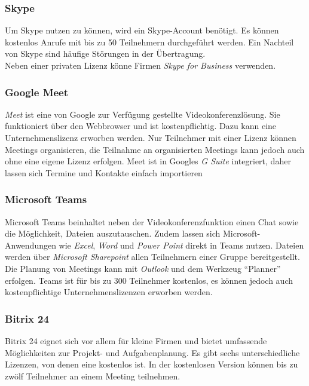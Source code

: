 \subsubsection{Skype}
Um Skype nutzen zu können, wird ein Skype-Account benötigt.
Es können kostenlos Anrufe mit bis zu 50 Teilnehmern durchgeführt werden.
Ein Nachteil von Skype sind häufige Störungen in der Übertragung.
\autocite[Vgl.][]{M_Straub.o.J.}
\\
Neben einer privaten Lizenz könne Firmen \textit{Skype for Business} verwenden.
\autocite[Vgl.][]{M_Microsoft.o.J.}

\subsubsection{Google Meet}
\textit{Meet} ist eine von Google zur Verfügung gestellte Videokonferenzlösung.
Sie funktioniert über den Webbrowser und ist kostenpflichtig.
Dazu kann eine Unternehmenslizenz erworben werden.
Nur Teilnehmer mit einer Lizenz können Meetings organisieren, die Teilnahme an organisierten Meetings kann jedoch auch ohne eine eigene Lizenz erfolgen.
Meet ist in Googles \textit{G Suite} integriert, daher lassen sich Termine und Kontakte einfach importieren
\autocite[Vgl.][]{M_Straub.o.J.}

\subsubsection{Microsoft Teams}
Microsoft Teams beinhaltet neben der Videokonferenzfunktion einen Chat sowie die Möglichkeit, Dateien auszutauschen.
Zudem lassen sich Microsoft-Anwendungen wie \textit{Excel}, \textit{Word} und \textit{Power Point} direkt in Teams nutzen.
Dateien werden über \textit{Microsoft Sharepoint} allen Teilnehmern einer Gruppe bereitgestellt.
Die Planung von Meetings kann mit \textit{Outlook} und dem Werkzeug \enquote{Planner} erfolgen.
Teams ist für bis zu 300 Teilnehmer kostenlos, es können jedoch auch kostenpflichtige Unternehmenslizenzen erworben werden.
\autocite[Vgl.][]{M_Straub.o.J.}

\subsubsection{Bitrix 24}
Bitrix 24 eignet sich vor allem für kleine Firmen und bietet umfassende Möglichkeiten zur Projekt- und Aufgabenplanung.
Es gibt sechs unterschiedliche Lizenzen, von denen eine kostenlos ist.
In der kostenlosen Version können bis zu zwölf Teilnehmer an einem Meeting teilnehmen.
\autocite[Vgl.][]{M_Straub.o.J.}

